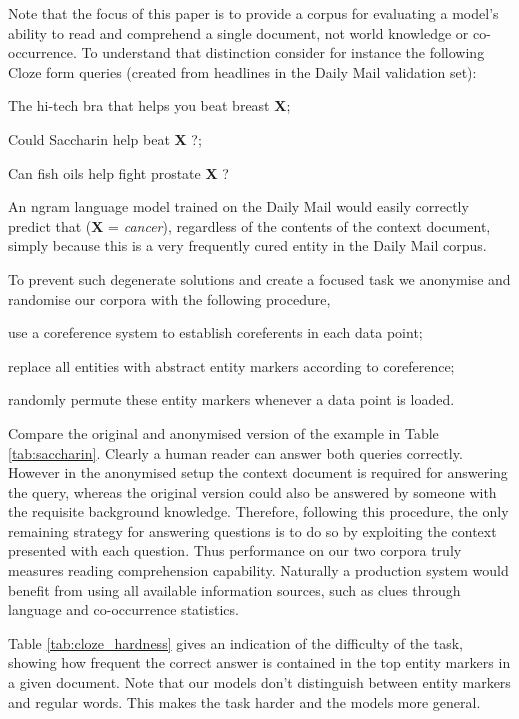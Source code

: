 \documentclass{article}
\begin{document}
Note that the focus of this paper is to provide a corpus for evaluating a model's
ability to read and comprehend a single document, not world knowledge or
co-occurrence. To understand that distinction consider for instance the
following Cloze form queries (created from headlines in the Daily Mail
validation set):
\begin{inparaenum}
  \item The hi-tech bra that helps you beat breast \textbf{X};
  \item Could Saccharin help beat \textbf{X} ?;
  \item Can fish oils help fight prostate \textbf{X} ?
\end{inparaenum}
An ngram language model trained on the Daily Mail would easily correctly predict
that (\textbf{X} = \textit{cancer}), regardless of the contents of the context
document, simply because this is a very frequently cured entity in the Daily Mail
corpus.

To prevent such degenerate solutions and create a focused task we anonymise and
randomise our corpora with the following procedure,
\begin{inparaenum}
  \item use a coreference system to establish coreferents in each
    data point;
  \item replace all entities with abstract entity markers according to
    coreference;
  \item randomly permute these entity markers whenever a data point is loaded.
\end{inparaenum}

Compare the original and anonymised version of the example in Table
\ref{tab:saccharin}. Clearly a human reader can answer both queries correctly.
However in the anonymised setup the context document is required for answering
the query, whereas the original version could also be answered by someone with
the requisite background knowledge.
Therefore, following this procedure, the only remaining strategy for answering
questions is to do so by exploiting the context presented with each question.
Thus performance on our two corpora truly measures reading comprehension
capability.  Naturally a production system would benefit from using all
available information sources, such as clues through language and co-occurrence
statistics.

Table \ref{tab:cloze_hardness} gives an indication of the difficulty of the
task, showing how frequent the correct answer is contained in the top  entity
markers in a given document. Note that our models don't distinguish between
entity markers and regular words. This makes the task harder and the models more
general.
\end{document}
